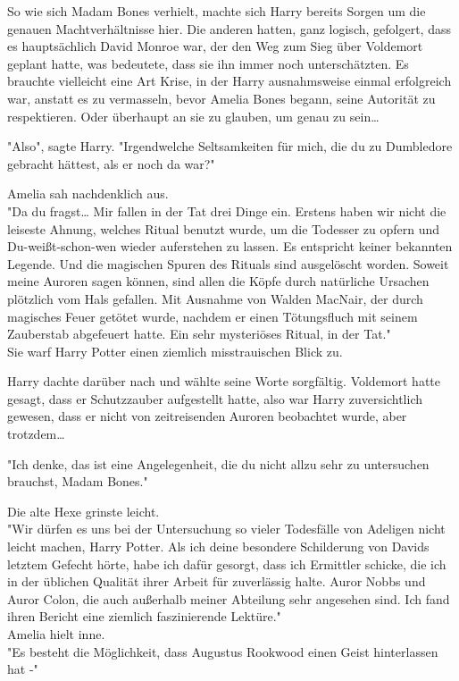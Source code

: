 {So wie sich Madam Bones verhielt, machte sich Harry bereits Sorgen um die genauen Machtverhältnisse hier. Die anderen hatten, ganz logisch, gefolgert, dass es hauptsächlich David Monroe war, der den Weg zum Sieg über Voldemort geplant hatte, was bedeutete, dass sie ihn immer noch unterschätzten. Es brauchte vielleicht eine Art Krise, in der Harry ausnahmsweise einmal erfolgreich war, anstatt es zu vermasseln, bevor Amelia Bones begann, seine Autorität zu respektieren. Oder überhaupt an sie zu glauben, um genau zu sein…

"Also", sagte Harry. "Irgendwelche Seltsamkeiten für mich, die du zu Dumbledore gebracht hättest, als er noch da war?"

Amelia sah nachdenklich aus.\\ "Da du fragst… Mir fallen in der Tat drei Dinge ein. Erstens haben wir nicht die leiseste Ahnung, welches Ritual benutzt wurde, um die Todesser zu opfern und Du-weißt-schon-wen wieder auferstehen zu lassen. Es entspricht keiner bekannten Legende. Und die magischen Spuren des Rituals sind ausgelöscht worden. Soweit meine Auroren sagen können, sind allen die Köpfe durch natürliche Ursachen plötzlich vom Hals gefallen. Mit Ausnahme von Walden MacNair, der durch magisches Feuer getötet wurde, nachdem er einen Tötungsfluch mit seinem Zauberstab abgefeuert hatte. Ein sehr mysteriöses Ritual, in der Tat."\\ Sie warf Harry Potter einen ziemlich misstrauischen Blick zu.

Harry dachte darüber nach und wählte seine Worte sorgfältig. Voldemort hatte gesagt, dass er Schutzzauber aufgestellt hatte, also war Harry zuversichtlich gewesen, dass er nicht von zeitreisenden Auroren beobachtet wurde, aber trotzdem…

"Ich denke, das ist eine Angelegenheit, die du nicht allzu sehr zu untersuchen brauchst, Madam Bones."

Die alte Hexe grinste leicht.\\ "Wir dürfen es uns bei der Untersuchung so vieler Todesfälle von Adeligen nicht leicht machen, Harry Potter. Als ich deine besondere Schilderung von Davids letztem Gefecht hörte, habe ich dafür gesorgt, dass ich Ermittler schicke, die ich in der üblichen Qualität ihrer Arbeit für zuverlässig halte. Auror Nobbs und Auror Colon, die auch außerhalb meiner Abteilung sehr angesehen sind. Ich fand ihren Bericht eine ziemlich faszinierende Lektüre."\\ Amelia hielt inne.\\ "Es besteht die Möglichkeit, dass Augustus Rookwood einen Geist hinterlassen hat -"

}
